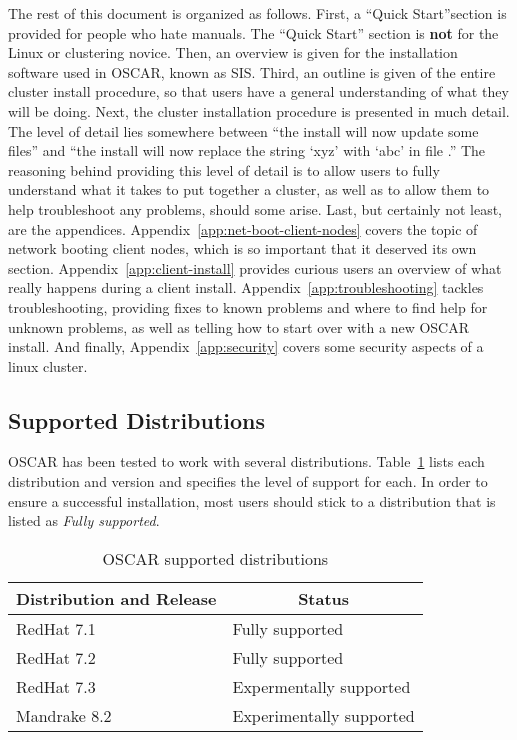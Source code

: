 The rest of this document is organized as follows.  First, a ``Quick
Start''section is provided for people who hate manuals.  The ``Quick
Start'' section is {\bf not} for the Linux or clustering novice. Then,
an overview is given for the installation software used in OSCAR,
known as SIS.  Third, an outline is given of the entire cluster
install procedure, so that users have a general understanding of what
they will be doing.  Next, the cluster installation procedure is
presented in much detail.  The level of detail lies somewhere between
``the install will now update some files'' and ``the install will now
replace the string `xyz' with `abc' in file .'' The
reasoning behind providing this level of detail is to allow users to
fully understand what it takes to put together a cluster, as well as
to allow them to help troubleshoot any problems, should some arise.
Last, but certainly not least, are the appendices.
Appendix~\ref{app:net-boot-client-nodes} covers the topic of network
booting client nodes, which is so important that it deserved its own
section.  Appendix~\ref{app:client-install} provides curious users an
overview of what really happens during a client install.
Appendix~\ref{app:troubleshooting} tackles troubleshooting, providing
fixes to known problems and where to find help for unknown problems,
as well as telling how to start over with a new OSCAR install.  And
finally, Appendix~\ref{app:security} covers some security aspects of a
linux cluster.

\subsection{Supported Distributions}

OSCAR has been tested to work with several distributions.
Table~\ref{tab:oscar-distro-support} lists each distribution and
version and specifies the level of support for each. In order to
ensure a successful installation, most users should stick to a
distribution that is listed as \emph{Fully supported}.

\begin{table}[htbp]
  \begin{center}
    \begin{tabular}{|l|p{3in}|}
      \hline
      \multicolumn{1}{|c|}{Distribution and Release} &
      \multicolumn{1}{|c|}{Status} \\
      \hline
      \hline
      RedHat 7.1 & Fully supported \\
%
      RedHat 7.2 & Fully supported \\
%
      RedHat 7.3 & Expermentally supported \\
%
\hline
%
      Mandrake 8.2 & Experimentally supported \\
      \hline
    \end{tabular}
    \caption{OSCAR supported distributions}
    \label{tab:oscar-distro-support}
  \end{center}
\end{table}
